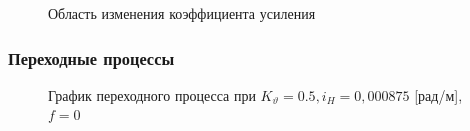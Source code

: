 \documentclass[a4paper,12pt]{article}
\begin{document}
\begin{enumerate}
    \begin{figure}[H]
        \caption{Область изменения коэффициента усиления}
        \label{fig:Область изменения коэффициента усиления}
    \end{figure}

    \end{enumerate}
    
    \subsubsection{Переходные процессы}

    \begin{figure}[H]
        \caption{График переходного процесса при $K_{\vartheta}=0.5, i_H=0,000875$ [рад/м], $f=0$}
        \label{fig:Переходный процесс 1}
    \end{figure}
\end{document}
